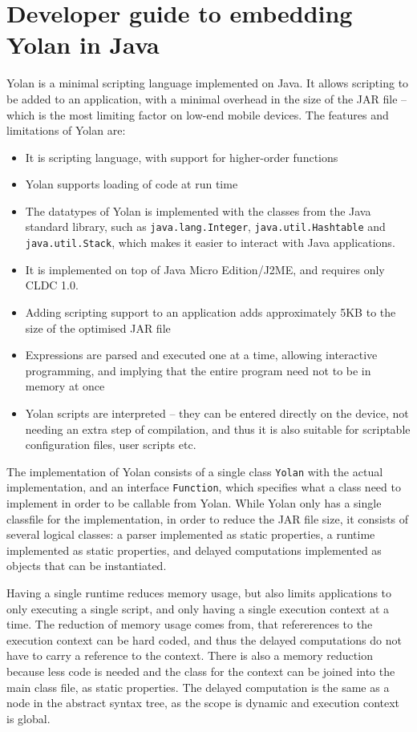 \documentclass[11pt]{report}
\begin{document}
\section{Developer guide to embedding Yolan in Java}
Yolan is a minimal scripting language implemented on Java.
It allows scripting to be added to an application, with a minimal overhead in the size of the JAR file -- which is the most limiting factor on low-end mobile devices. The features and limitations of Yolan are:
\begin{itemize}
\item It is scripting language, with support for higher-order functions
\item Yolan supports loading of code at run time
\item The datatypes of Yolan is implemented with the classes from the Java standard library, such as \verb|java.lang.Integer|, \verb|java.util.Hashtable| and \verb|java.util.Stack|, which makes it easier to interact with Java applications.
\item It is implemented on top of Java Micro Edition/J2ME, and requires only CLDC 1.0.
\item Adding scripting support to an application adds approximately 5KB to the size of the optimised JAR file
\item Expressions are parsed and executed one at a time, allowing interactive programming, and implying that the entire program need not to be in memory at once
\item Yolan scripts are interpreted -- they can be entered directly on the device, not needing an extra step of compilation, and thus it is also suitable for scriptable configuration files, user scripts etc.
\end{itemize}

The implementation of Yolan consists of a single class \verb|Yolan| with the actual implementation, and an interface \verb|Function|, which specifies what a class need to implement in order to be callable from Yolan.
While Yolan only has a single classfile for the implementation, in order to reduce the JAR file size, it consists of several logical classes: a parser implemented as static properties, a runtime implemented as static properties, and delayed computations implemented as objects that can be instantiated.

Having a single runtime reduces memory usage, but also limits applications to only executing a single script, and only having a single execution context at a time. The reduction of memory usage comes from, that refererences to the execution context can be hard coded, and thus the delayed computations do not have to carry a reference to the context. There is also a memory reduction because less code is needed and the class for the context can be joined into the main class file, as static properties.
The delayed computation is the same as a node in the abstract syntax tree, as the scope is dynamic and execution context is global. 
\end{document}
